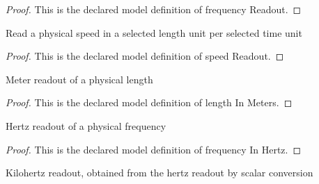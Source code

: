 \begin{proof}
  This is the declared model definition of frequency Readout.
\end{proof}
\begin{definition}
  \label{def:physics:phyx-mini-0185:phyxminiproblems-problemphyxmini0185-speedreadout}
  Read a physical speed in a selected length unit per selected time unit
\end{definition}
\begin{proof}
  This is the declared model definition of speed Readout.
\end{proof}
\begin{definition}
  \label{def:physics:phyx-mini-0185:phyxminiproblems-problemphyxmini0185-lengthinmeters}
  Meter readout of a physical length
\end{definition}
\begin{proof}
  This is the declared model definition of length In Meters.
\end{proof}
\begin{definition}
  \label{def:physics:phyx-mini-0185:phyxminiproblems-problemphyxmini0185-frequencyinhertz}
  Hertz readout of a physical frequency
\end{definition}
\begin{proof}
  This is the declared model definition of frequency In Hertz.
\end{proof}
\begin{definition}
  \label{def:physics:phyx-mini-0185:phyxminiproblems-problemphyxmini0185-frequencyinkilohertz}
  Kilohertz readout, obtained from the hertz readout by scalar conversion
\end{definition}
